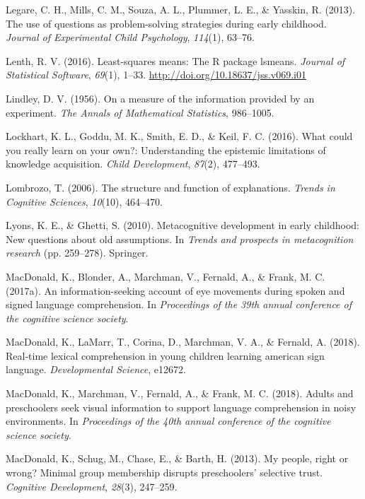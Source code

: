 \documentclass[oneside]{report}
\begin{document}
\hypertarget{ref-legare2013use}{}
Legare, C. H., Mills, C. M., Souza, A. L., Plummer, L. E., \& Yasskin,
R. (2013). The use of questions as problem-solving strategies during
early childhood. \emph{Journal of Experimental Child Psychology},
\emph{114}(1), 63--76.

\hypertarget{ref-lenth2016lsmeans}{}
Lenth, R. V. (2016). Least-squares means: The R package lsmeans.
\emph{Journal of Statistical Software}, \emph{69}(1), 1--33.
\url{http://doi.org/10.18637/jss.v069.i01}

\hypertarget{ref-lindley1956measure}{}
Lindley, D. V. (1956). On a measure of the information provided by an
experiment. \emph{The Annals of Mathematical Statistics}, 986--1005.

\hypertarget{ref-lockhart2016could}{}
Lockhart, K. L., Goddu, M. K., Smith, E. D., \& Keil, F. C. (2016). What
could you really learn on your own?: Understanding the epistemic
limitations of knowledge acquisition. \emph{Child Development},
\emph{87}(2), 477--493.

\hypertarget{ref-lombrozo2006structure}{}
Lombrozo, T. (2006). The structure and function of explanations.
\emph{Trends in Cognitive Sciences}, \emph{10}(10), 464--470.

\hypertarget{ref-lyons2010metacognitive}{}
Lyons, K. E., \& Ghetti, S. (2010). Metacognitive development in early
childhood: New questions about old assumptions. In \emph{Trends and
prospects in metacognition research} (pp. 259--278). Springer.

\hypertarget{ref-macdonald2017info}{}
MacDonald, K., Blonder, A., Marchman, V., Fernald, A., \& Frank, M. C.
(2017a). An information-seeking account of eye movements during spoken
and signed language comprehension. In \emph{Proceedings of the 39th
annual conference of the cognitive science society}.

\hypertarget{ref-macdonald2018real}{}
MacDonald, K., LaMarr, T., Corina, D., Marchman, V. A., \& Fernald, A.
(2018). Real-time lexical comprehension in young children learning
american sign language. \emph{Developmental Science}, e12672.

\hypertarget{ref-macdonald2018noise}{}
MacDonald, K., Marchman, V., Fernald, A., \& Frank, M. C. (2018). Adults
and preschoolers seek visual information to support language
comprehension in noisy environments. In \emph{Proceedings of the 40th
annual conference of the cognitive science society}.

\hypertarget{ref-macdonald2013my}{}
MacDonald, K., Schug, M., Chase, E., \& Barth, H. (2013). My people,
right or wrong? Minimal group membership disrupts preschoolers'
selective trust. \emph{Cognitive Development}, \emph{28}(3), 247--259.
\end{document}
